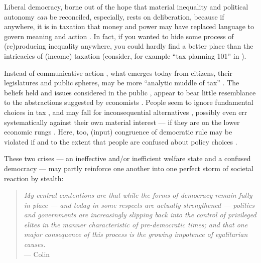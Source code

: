 

Liberal democracy, borne out of the hope that material inequality and political autonomy \emph{can} be reconciled, %
especially, rests on deliberation, because if anywhere, it is in taxation that money and power may have replaced language to govern meaning and action \citep{Habermas-1971}.
In fact, if you wanted to hide some process of (re)producing inequality anywhere, you could hardly find a better place than the intricacies of (income) taxation (consider, for example ``tax planning 101'' in \citealt[888]{McCaffery2005}). 

Instead of communicative action \citep{Habermas1984}, what emerges today from citizens, their legislatures and public spheres, may be more ``analytic muddle of tax'' \citep[862]{McCaffery2005}.
The beliefs held and issues considered in the public \citep[for example,][]{Caplan2007}, appear to bear little resemblance to the abstractions suggested by economists \cite[for example,][]{Harberger1974}.
People seem to ignore fundamental choices in tax \citep[for example,][]{McCafferyHines2010}, and may fall for inconsequential alternatives \citep[for example,][]{SausgruberTyran2011}, possibly even err systematically against their own material interest --- if they are on the lower economic rungs \citep[for a German example,][]{Kemmerling2009}.
Here, too, (input) congruence of democratic rule may be violated if and to the extent that people are confused about policy choices \citep[compare][90]{Zurn-2000-aa}.

These two crises --- an ineffective and/or inefficient welfare state and a confused democracy --- may partly reinforce one another into one perfect storm of societal reaction by stealth: 
\begin{quote}
	\emph{
	My central contentions are that while the forms of democracy remain fully in place --- and today in some respects are actually strengthened --- politics and governments are increasingly slipping back into the control of privileged elites in the manner characteristic of pre-democratic times; and that one major consequence of this process is the growing impotence of egalitarian causes.}\\
	--- Colin \cite[6]{Crouch2004}
\end{quote}


